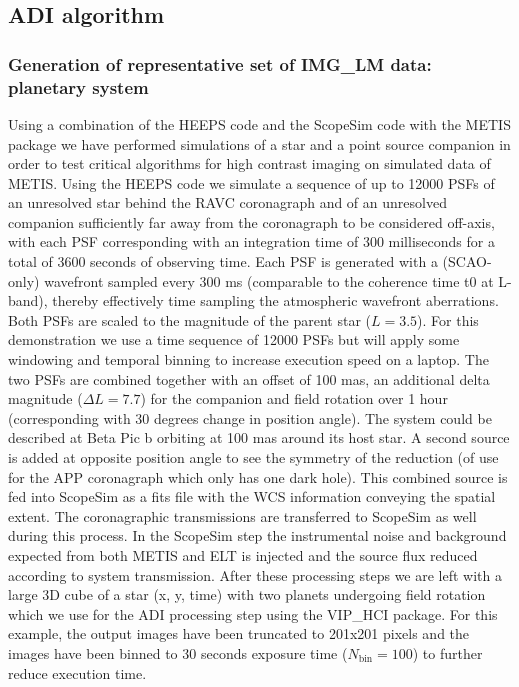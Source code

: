 \subsection{ADI algorithm}
\subsubsection{Generation of representative set of IMG\_LM data: planetary system}
Using a combination of the HEEPS code and the ScopeSim code with the METIS package we have performed simulations of a star and a point source companion in order to test critical algorithms for high contrast imaging on simulated data of METIS.
Using the HEEPS code we simulate a sequence of up to 12000 PSFs of an unresolved star behind the RAVC coronagraph and of an unresolved companion sufficiently far away from the coronagraph to be considered off-axis, with each PSF corresponding with an integration time of 300 milliseconds for a total of 3600 seconds of observing time. Each PSF is generated with a (SCAO-only) wavefront sampled every 300 ms (comparable to the coherence time t0 at L-band), thereby effectively time sampling the atmospheric wavefront aberrations. Both PSFs are scaled to the magnitude of the parent star ($L=3.5$). For this demonstration we use a time sequence of 12000 PSFs but will apply some windowing and temporal binning to increase execution speed on a laptop. 
The two PSFs are combined together with an offset of 100 mas, an additional delta magnitude ($\Delta L=7.7$) for the companion and field rotation over 1 hour (corresponding with 30 degrees change in position angle). The system could be described at Beta Pic b orbiting at 100 mas around its host star. A second source is added at opposite position angle to see the symmetry of the reduction (of use for the APP coronagraph which only has one dark hole). This combined source is fed into ScopeSim as a fits file with the WCS information conveying the spatial extent. The coronagraphic transmissions are transferred to ScopeSim as well during this process.
In the ScopeSim step the instrumental noise and background expected from both METIS and ELT is injected and the source flux reduced according to system transmission. 
After these processing steps we are left with a large 3D cube of a star (x, y, time) with two planets undergoing field rotation which we use for the ADI processing step using the VIP\_HCI package. For this example, the output images have been truncated to 201x201 pixels and the images have been binned to 30 seconds exposure time ($N_\mathrm{bin}=100$) to further reduce execution time.
